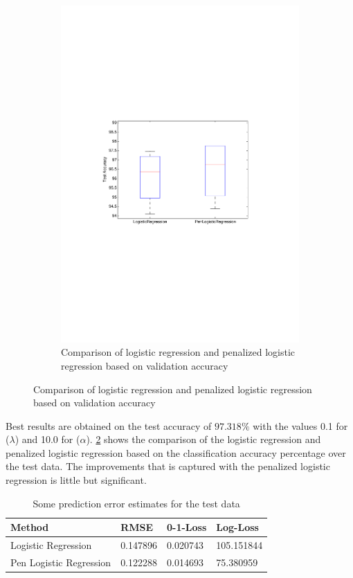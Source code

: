 \begin{figure}[h]
\begin{subfigure}[b]{0.45\textwidth}
    \includegraphics[clip, trim=4cm 10cm 3cm 10cm, width=\textwidth]{figures/comparison_LR_pLR.pdf}
    \caption{Comparison of logistic regression and penalized logistic regression based on validation accuracy}
    \label{fig:comp_LR_pLR}
  \end{subfigure}
\end{figure}

Best results are obtained on the test accuracy of $97.318\%$ with the values 0.1 for ($\lambda$) and 10.0 for ($\alpha$).
\ref{fig:comp_LR_pLR} shows the comparison of the logistic regression and penalized logistic regression based on the classification accuracy percentage over the test data. The improvements that is captured with the penalized logistic regression is little but significant.  

\begin{table}[h!]
\begin{center}
    \begin{tabular}{ | l | l | l | p{5cm} |}
    \hline
    Method & RMSE & 0-1-Loss & Log-Loss \\ \hline
    Logistic Regression & 0.147896 & 0.020743 & 105.151844 \\ \hline
    Pen Logistic Regression & 0.122288 & 0.014693 & 75.380959 \\ \hline
    \end{tabular}
\end{center}
\caption{Some prediction error estimates for the test data}
\label{table:test_errors}
\end{table}
 
